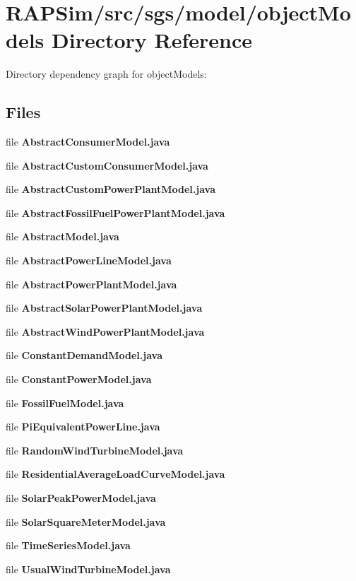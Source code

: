 \section{R\-A\-P\-Sim/src/sgs/model/object\-Models Directory Reference}
\label{dir_91f1ede7c937e1f930005bcd8bc1b745}
Directory dependency graph for object\-Models\-:
\subsection*{Files}
\begin{DoxyCompactItemize}
\item 
file {\bf Abstract\-Consumer\-Model.\-java}
\item 
file {\bf Abstract\-Custom\-Consumer\-Model.\-java}
\item 
file {\bf Abstract\-Custom\-Power\-Plant\-Model.\-java}
\item 
file {\bf Abstract\-Fossil\-Fuel\-Power\-Plant\-Model.\-java}
\item 
file {\bf Abstract\-Model.\-java}
\item 
file {\bf Abstract\-Power\-Line\-Model.\-java}
\item 
file {\bf Abstract\-Power\-Plant\-Model.\-java}
\item 
file {\bf Abstract\-Solar\-Power\-Plant\-Model.\-java}
\item 
file {\bf Abstract\-Wind\-Power\-Plant\-Model.\-java}
\item 
file {\bf Constant\-Demand\-Model.\-java}
\item 
file {\bf Constant\-Power\-Model.\-java}
\item 
file {\bf Fossil\-Fuel\-Model.\-java}
\item 
file {\bf Pi\-Equivalent\-Power\-Line.\-java}
\item 
file {\bf Random\-Wind\-Turbine\-Model.\-java}
\item 
file {\bf Residential\-Average\-Load\-Curve\-Model.\-java}
\item 
file {\bf Solar\-Peak\-Power\-Model.\-java}
\item 
file {\bf Solar\-Square\-Meter\-Model.\-java}
\item 
file {\bf Time\-Series\-Model.\-java}
\item 
file {\bf Usual\-Wind\-Turbine\-Model.\-java}
\end{DoxyCompactItemize}

